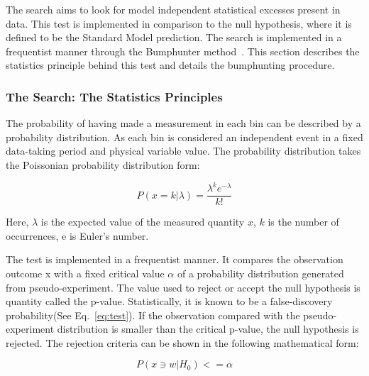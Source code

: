 The search aims to look for model independent statistical excesses present in data. This test is implemented in comparison to the null hypothesis, where it is defined to be the Standard Model prediction. The search is implemented in a frequentist manner through the Bumphunter method~\cite{choudalakis2011hypothesis}. This section describes the statistics principle behind this test and details the bumphunting procedure. 



\subsubsection{The Search: The Statistics Principles}
The probability of having made a measurement in each bin can be described by a probability distribution. As each bin is considered an independent event in a fixed data-taking period and physical variable value. The probability distribution takes the Poissonian probability distribution form:

\begin{equation}
 P(x=k|\lambda) = \frac{\lambda^{k}e^{-\lambda}}{k!} 
 \label{eq:Poissonian}
\end{equation}

Here, $\lambda$ is the expected value of the measured quantity $x$, $k$ is the number of occurrences, e is Euler's number.

The test is implemented in a frequentist manner. It compares the observation outcome x with a fixed critical value $\alpha$ of a probability distribution generated from pseudo-experiment. The value used to reject or accept the null hypothesis is quantity called the p-value. Statistically, it is known to be a false-discovery probability(See Eq.~\ref{eq:test}). If the observation compared with the pseudo-experiment distribution is smaller than the critical p-value, the null hypothesis is rejected. The rejection criteria can be shown in the following mathematical form:

\begin{equation}
    P(x \ni w|H_0)<= \alpha 
    \label{eq:test}
\end{equation}

